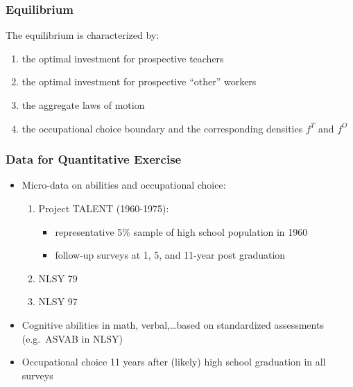 \documentclass[11pt]{beamer}
\begin{document}
\begin{frame}
\frametitle{Equilibrium}
The equilibrium is characterized by:
\begin{enumerate}
  \item the optimal investment for prospective teachers 
  \item the optimal investment for prospective ``other'' workers
  \item the aggregate laws of motion
  \item the occupational choice boundary and the corresponding densities $f^T$ and $f^O$
\end{enumerate}
\end{frame}

\begin{frame}
\frametitle{Data for Quantitative Exercise}
\begin{itemize}
  \item Micro-data on abilities and occupational choice:
\begin{enumerate}
  \item Project TALENT (1960-1975):
  \begin{itemize}
  \item representative 5\% sample of high school population in 1960
  \item follow-up surveys at 1, 5, and 11-year post graduation
\end{itemize}
  \item NLSY 79
  \item NLSY 97
\end{enumerate}
  \item Cognitive abilities in math, verbal,\ldots based on standardized assessments (e.g.~ASVAB in NLSY)
  \item Occupational choice 11 years after (likely) high school graduation in all surveys
\end{itemize}
\end{frame}
\end{document}

